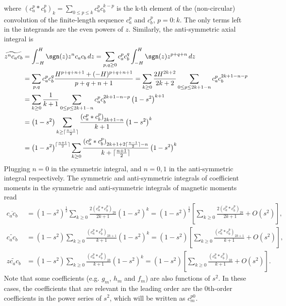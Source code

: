 where $(c_a^p * c_b^p)_{k} = \sum_{0\leq p \leq k} c_a^p c_b^{k-p}$ is the k-th element of the (non-circular) convolution of the finite-length sequence $c_a^p$ and $c_b^p$, $p=0:k$. The only terms left in the integrands are the even powers of $z$. Similarly, the anti-symmetric axial integral is
\begin{equation}
    \begin{aligned}
        \widetilde{z^n c_a c_b} &= \int_{-H}^H \sgn(z) z^n c_a c_b \, dz = \sum_{p, q \geq 0} c_a^p c_b^q \int_{-H}^H \sgn(z) z^{p + q + n} \, dz \\
        &= \sum_{p,q} c_a^p c_b^q \frac{H^{p+q+n+1} + (-H)^{p+q+n+1}}{p + q + n + 1} 
        = \sum_{k\geq 0} \frac{2H^{2k+2}}{2k+2} \sum_{0\leq p \leq 2k+1-n} c_a^p c_b^{2k+1-n-p} \\ 
        &= \sum_{k\geq 0} \frac{1}{k+1} \sum_{0\leq p \leq 2k+1-n} c_a^p c_b^{2k+1-n-p} \left(1-s^2\right)^{k+1} \\
        &= \left(1 - s^2\right) \sum_{k\geq \lceil \frac{n-1}{2}\rceil} \frac{\left(c_a^{p} * c_b^p\right)_{2k+1-n}}{k+1} \left(1 - s^2\right)^k \\ 
        &= \left(1 - s^2\right)^{\lceil \frac{n+1}{2}\rceil} \sum_{k\geq 0} \frac{\left(c_a^{p} * c_b^p\right)_{2k+1+2\lceil \frac{n-1}{2} \rceil -n}}{k+\lceil \frac{n+1}{2}\rceil} \left(1 - s^2\right)^k
    \end{aligned}
\end{equation}
Plugging $n=0$ in the symmetric integral, and $n=0,1$ in the anti-symmetric integral respectively. The symmetric and anti-symmetric integrals of coefficient moments in the symmetric and anti-symmetric integrals of magnetic moments read
\begin{equation}
    \begin{aligned}
        \overline{c_a c_b} &= \left(1 - s^2\right)^{\frac{1}{2}} \sum_{k \geq 0} \frac{2(c_a^p * c_b^p)_{2k}}{2k+1} \left(1 - s^2\right)^k = \left(1 - s^2\right)^{\frac{1}{2}} \left[\sum_{k\geq 0} \frac{2(c_a^p * c_b^p)_{2k}}{2k+1} + O\left(s^2\right)\right], \\ 
        \widetilde{c_a c_b} &= \left(1 - s^2\right) \sum_{k \geq 0} \frac{(c_a^p * c_b^p)_{2k+1}}{k+1} \left(1 - s^2\right)^k = \left(1 - s^2\right) \left[\sum_{k\geq 0} \frac{(c_a^p*c_b^p)_{2k+1}}{k+1} + O\left(s^2\right) \right], \\ 
        \widetilde{z c_a c_b} &= \left(1 - s^2\right) \sum_{k \geq 0} \frac{(c_a^p * c_b^p)_{2k}}{k+1} \left(1 - s^2\right)^k = \left(1 - s^2\right) \left[\sum_{k \geq 0} \frac{(c_a^p * c_b^p)_{2k}}{k+1} + O\left(s^2\right)\right].
    \end{aligned}
\end{equation}
Note that some coefficients (e.g. $g_m$, $h_m$ and $f_m$) are also functions of $s^2$. In these cases, the coefficients that are relevant in the leading order are the 0th-order coefficients in the power series of $s^2$, which will be written as $c_m^{p0}$. 

